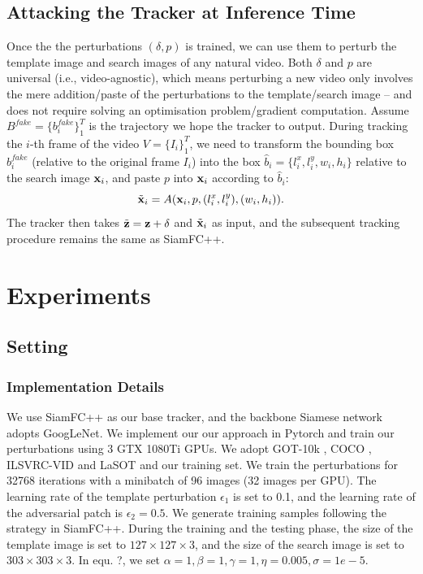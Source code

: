 \documentclass{article}
\begin{document}
\subsection{Attacking the Tracker at Inference Time}

Once the the perturbations $(\delta, p)$ is trained, we can use them to perturb the template image and search images of any natural video. Both $\delta$ and $p$ are universal (i.e., video-agnostic), which means perturbing a new video only involves the mere addition/paste of the perturbations to the template/search image -- and does not require solving an optimisation problem/gradient computation.
Assume $B^{fake}=\{b^{fake}_i\}_1^{T}$ is the trajectory we hope the tracker to output.
During tracking the $i$-th frame of the video $V=\{I_i\}_1^T$, we need to transform the bounding box $b^{fake}_i$ (relative to the original frame $I_i$) into the box $\hat b_i=\{l^x_i, l^y_i, w_i, h_i\}$ relative to the search image $\textbf x_i$, and paste $p$ into $\textbf x_i$ according to $\hat b_i$:
\begin{equation}
\tilde{\textbf x}_i = A(\textbf x_i, p, (l^x_i, l^y_i), (w_i, h_i)).
\end{equation}
The tracker then takes $\tilde{\textbf z}=\textbf z+\delta$ and $\tilde{ \textbf x}_i$ as input, and the subsequent tracking procedure remains the same as SiamFC++.

\section{Experiments}

\subsection{Setting}

\subsubsection{Implementation Details}

We use SiamFC++ as our base tracker, and the backbone Siamese network adopts GoogLeNet.
We implement our our approach in Pytorch and train our perturbations using 3 GTX 1080Ti GPUs.
We adopt GOT-10k \cite{GOT-10k}, COCO \cite{COCO}, ILSVRC-VID \cite{VID} and LaSOT \cite{LaSOT} and our training set.
We train the perturbations for 32768 iterations with a minibatch of 96 images (32 images per GPU).
The learning rate of the template perturbation $\epsilon_1$ is set to 0.1, and the learning rate of the adversarial patch is $\epsilon_2 = 0.5$.
We generate training samples following the strategy in SiamFC++.
During the training and the testing phase, the size of the template image is set to $127\times 127\times 3$, and the size of the search image is set to $303\times 303\times 3$.
In equ. ?, we set $\alpha=1, \beta=1, \gamma=1, \eta=0.005, \sigma=1e-5$.
\end{document}
